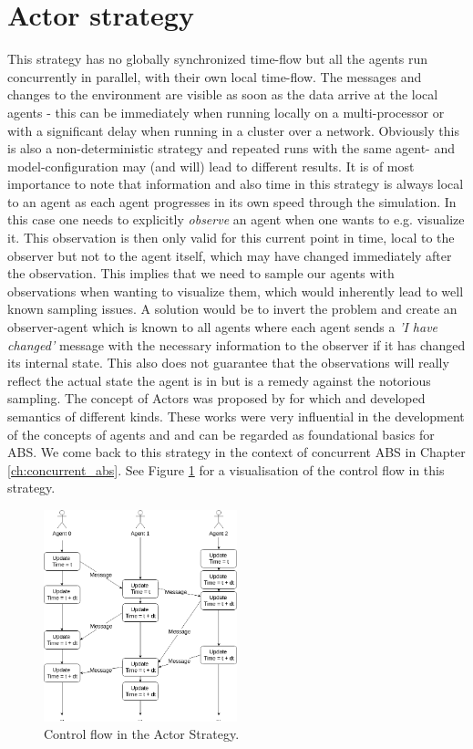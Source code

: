 \section{Actor strategy}
\label{sub:act_strategy}
This strategy has no globally synchronized time-flow but all the agents run concurrently in parallel, with their own local time-flow. The messages and changes to the environment are visible as soon as the data arrive at the local agents - this can be immediately when running locally on a multi-processor or with a significant delay when running in a cluster over a network. Obviously this is also a non-deterministic strategy and repeated runs with the same agent- and model-configuration may (and will) lead to different results. It is of most importance to note that information and also time in this strategy is always local to an agent as each agent progresses in its own speed through the simulation. In this case one needs to explicitly \textit{observe} an agent when one wants to e.g. visualize it. This observation is then only valid for this current point in time, local to the observer but not to the agent itself, which may have changed immediately after the observation. This implies that we need to sample our agents with observations when wanting to visualize them, which would inherently lead to well known sampling issues. A solution would be to invert the problem and create an observer-agent which is known to all agents where each agent sends a \textit{'I have changed'} message with the necessary information to the observer if it has changed its internal state. This also does not guarantee that the observations will really reflect the actual state the agent is in but is a remedy against the notorious sampling. The concept of Actors was proposed by \cite{hewitt_universal_1973} for which \cite{grief_semantics_1975} and \cite{clinger_foundations_1981} developed semantics of different kinds. These works were very influential in the development of the concepts of agents and and can be regarded as foundational basics for ABS. We come back to this strategy in the context of concurrent ABS in Chapter \ref{ch:concurrent_abs}. See Figure \ref{fig:strategy_act} for a visualisation of the control flow in this strategy.

\begin{figure}[H]
	\centering
	\includegraphics[width=0.5\textwidth, angle=0]{./fig/implabs/actor.png}
	\caption{Control flow in the Actor Strategy.}
	\label{fig:strategy_act}
\end{figure}

